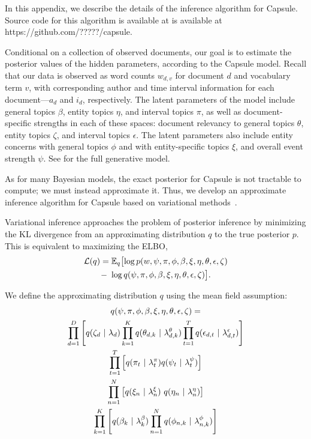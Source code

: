 
In this appendix, we describe the details of the inference algorithm for Capsule. Source code for this algorithm is available at is available at https://github.com/?????/capsule.

Conditional on a collection of observed documents, our goal is to estimate the posterior values of the hidden parameters, according to the Capsule model.   Recall that our data is observed as word counts $w_{d,v}$ for document $d$ and vocabulary term $v$, with corresponding author and time interval information for each document---$a_d$ and $i_d$, respectively.
The latent parameters of the model include general topics $\beta$, entity topics $\eta$, and interval topics $\pi$, as well as document-specific strengths in each of these spaces: document relevancy to general topics $\theta$, entity topics $\zeta$, and interval topics $\epsilon$.  The latent parameters also include entity concerns with general topics $\phi$ and with entity-specific topics $\xi$, and overall event strength $\psi$.  See  for the full generative model.

As for many Bayesian models, the exact posterior for Capsule is not tractable to compute; we must instead approximate it.  Thus, we develop an approximate inference algorithm for Capsule based on variational methods~\cite{jordan1999introduction,Wainwright:2008}.

Variational inference approaches the problem of posterior inference by minimizing the KL divergence from an approximating distribution $q$ to the true posterior $p$.
This is equivalent to maximizing the ELBO,
\begin{multline}
	\mathcal{L}(q)  = \mathbb{E}_{q}\bigl[\log p(w, \psi, \pi, \phi, \beta, \xi, \eta, \theta, \epsilon, \zeta) \\
	-~\log q(\psi, \pi, \phi, \beta, \xi, \eta, \theta, \epsilon, \zeta)\bigr].
	\label{eq:elbo}
\end{multline}

We define the approximating distribution $q$ using the mean field assumption:
\begin{multline}
	q(\psi, \pi, \phi, \beta, \xi, \eta, \theta, \epsilon, \zeta) = \\
	 	\prod_{d=1}^D \left[q(\zeta_d ~\vert~ \lambda_d)
				\prod_{k=1}^K q(\theta_{d,k} ~\vert~ \lambda^\theta_{d,k})
				\prod_{t=1}^T q(\epsilon_{d,t} ~\vert~ \lambda^\epsilon_{d,t})
			\right] \\
		\prod_{t=1}^T \left[ q(\pi_{t} ~\vert~ \lambda^\pi_t) q(\psi_t ~\vert~ \lambda^\psi_t) \right] \\
		\prod_{n=1}^N \left[ q(\xi_{n} ~\vert~ \lambda^\xi_{n})~q(\eta_n ~\vert~ \lambda^{\eta}_{n}) \right] \\
		\prod_{k=1}^K \left[ q(\beta_{k} ~\vert~ \lambda^\beta_k) \prod_{n=1}^N q(\phi_{n,k} ~\vert~ \lambda^\phi_{n,k}) \right]
	\label{eq:q}
\end{multline}

